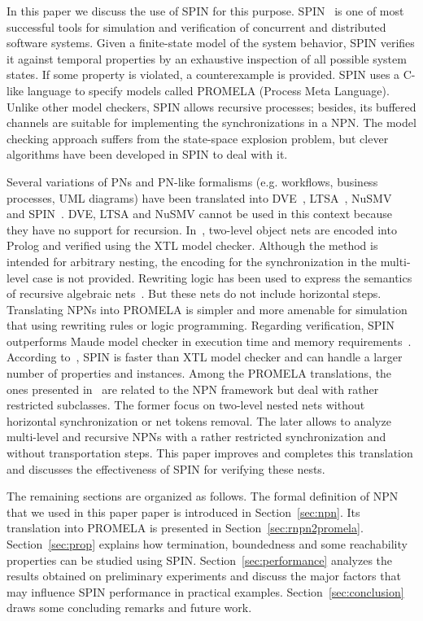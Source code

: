\documentclass{llncs}
\begin{document}
In this paper we discuss the use of SPIN for this purpose. SPIN~\cite{spin} is one of most successful tools for simulation and verification of concurrent and distributed software systems. Given a finite-state model of the system behavior, SPIN verifies it against temporal properties by an exhaustive inspection of all possible system states. If some property is violated, a counterexample is provided. SPIN uses a C-like language to specify models called PROMELA (Process Meta Language). Unlike other model checkers, SPIN allows recursive processes; besides, its buffered channels are suitable for implementing the synchronizations in a NPN. The model checking approach suffers from the state-space explosion problem, but clever algorithms have been developed in SPIN to deal with it.

Several variations of PNs and PN-like formalisms (e.g. workflows, business processes, UML diagrams) have been translated into DVE~\cite{Leyla:2010}, LTSA~\cite{Regis2012}, NuSMV~\cite{Eshuis:2006} and SPIN~\cite{Gannod01,Farwer:2004,Ribeiro07,acwfnet2spin,wfnet2spin,Chang:2011}. DVE, LTSA and NuSMV cannot be used in this context because they have no support for recursion. In~\cite{Farwer:2004}, two-level object nets are encoded into Prolog and verified using the XTL model checker. Although the method is intended for arbitrary nesting, the encoding for the synchronization in the multi-level case is not provided. Rewriting logic has been used to express the semantics of recursive algebraic nets~\cite{ECATNets:2008}. But these nets do not include horizontal steps. Translating NPNs into PROMELA is simpler and more amenable for simulation that using rewriting rules or logic programming. Regarding verification, SPIN outperforms Maude model checker in execution time and memory requirements~\cite{Eker:2002}. According to~\cite{Frappier:2010}, SPIN is faster than XTL model checker and can handle a larger number of properties and instances. Among the PROMELA translations, the ones presented in~\cite{Chang:2011,venero2013a} are related to the NPN framework but deal with rather restricted subclasses. The former focus on two-level nested nets without horizontal synchronization or net tokens removal. The later allows to analyze multi-level and recursive NPNs with a rather restricted synchronization and without transportation steps. This paper improves and completes this translation and discusses the effectiveness of SPIN for verifying these nests.

The  remaining sections are organized as follows. The formal definition of NPN that we used in this paper paper is introduced in Section~\ref{sec:npn}. Its translation into PROMELA is presented in Section~\ref{sec:rnpn2promela}. Section~\ref{sec:prop} explains how termination, boundedness and some reachability properties can be studied using SPIN. Section~\ref{sec:performance} analyzes the results obtained on preliminary experiments and discuss the major factors that may influence SPIN performance in practical examples. Section~\ref{sec:conclusion} draws some concluding remarks and future work.
\end{document}
